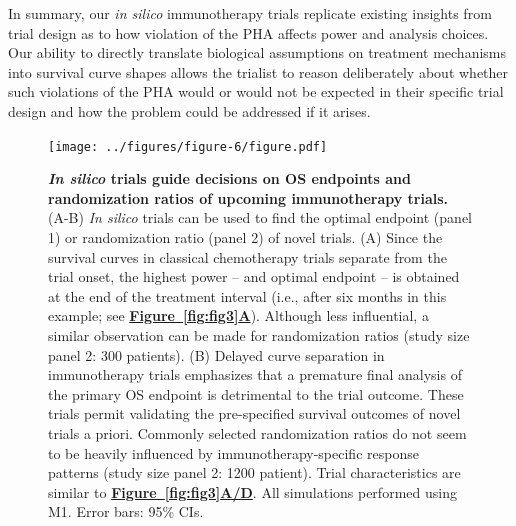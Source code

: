 \documentclass[a4paper,10pt]{article}
\newcommand{\myref}[2]{\hyperref[#1]{\bfseries Figure~\ref*{#1}#2}}
\begin{document}
In summary, our \emph{in silico} immunotherapy trials replicate existing insights from trial design 
as to how violation of the PHA affects power and analysis choices. Our ability to
directly translate biological assumptions on treatment mechanisms into survival
curve shapes allows the trialist to reason deliberately about whether
such violations of the PHA would or would not be expected in their specific
trial design and how the problem could be addressed if it arises.


\begin{figure}

\centering
\texttt{[image: ../figures/figure-6/figure.pdf]}

	\caption{
	{\bfseries \emph{In silico} trials guide decisions on OS endpoints and randomization ratios 
		of upcoming immunotherapy trials.} (A-B) \emph{In silico} trials can be used to
		find the optimal endpoint (panel
		1) or randomization ratio (panel 2) of novel trials. (A) Since the
		survival curves in classical chemotherapy trials separate from the
		trial onset, the highest power – and optimal endpoint – is
		obtained at the end of the treatment interval (i.e., after six months
		in this example; see \myref{fig:fig3}{A}). Although less influential, a similar
		observation can be made for randomization ratios (study size panel 2:
		300 patients). (B) Delayed curve separation in immunotherapy trials
		emphasizes that a premature final analysis of the primary OS endpoint
		is detrimental to the trial outcome. These trials permit validating the
		pre-specified survival outcomes of novel trials a priori. Commonly
		selected randomization ratios do not seem to be heavily influenced by
		immunotherapy-specific response patterns (study size panel 2: 1200
		patient). Trial characteristics are similar to \myref{fig:fig3}{A/D}. All simulations
		performed using M1. Error bars: 95\% CIs.}
	\label{fig:fig5}
\end{figure}
\end{document}
